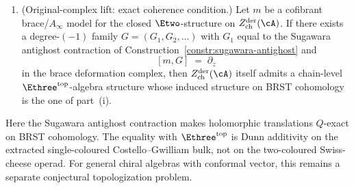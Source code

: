 \begin{theorem}
\begin{enumerate}[label=\textup{(\roman*)}]
\item \textup{(Original-complex lift: exact coherence condition.)}
 Let $m$ be a cofibrant brace/$A_\infty$ model for the
 closed $\Etwo$-structure on
 $Z^{\mathrm{der}}_{\mathrm{ch}}(\cA)$.
 If there exists a degree-$(-1)$ family
 $G = (G_1, G_2, \ldots)$ with
 $G_1$ equal to the Sugawara antighost contraction of
 Construction~\textup{\ref{constr:sugawara-antighost}}
 and
 \[
 [m, G] \;=\; \partial_z
 \]
 in the brace deformation complex, then
 $Z^{\mathrm{der}}_{\mathrm{ch}}(\cA)$ itself admits a
 chain-level $\Ethree^{\mathrm{top}}$-algebra structure
 whose induced structure on BRST cohomology is the one of
 part~\textup{(i)}.
\end{enumerate}
Here the Sugawara antighost contraction makes holomorphic
translations $Q$-exact on BRST cohomology. The equality with
$\Ethree^{\mathrm{top}}$ is Dunn additivity on the extracted
single-coloured Costello--Gwilliam bulk, not on the
two-coloured Swiss-cheese operad. For general chiral algebras
with conformal vector, this remains a separate conjectural
topologization problem.
\end{theorem}

